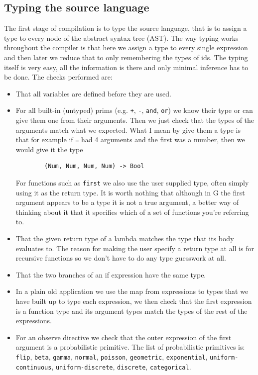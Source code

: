 \documentclass[a4paper]{article}
\begin{document}
\subsection{Typing the source language}

The first stage of compilation is to type the source language, that is to assign a type to every node of the abstract syntax tree (AST). The way typing works throughout the compiler is that here we assign a type to every single expression and then later we reduce that to only remembering the types of ids. The typing itself is very easy, all the information is there and only minimal inference has to be done. The checks performed are:
\begin{itemize}
\item
	That all variables are defined before they are used.

\item
	For all built-in (untyped) prims (e.g. \texttt{+}, \texttt{-}, \texttt{and}, \texttt{or}) we know their type or can give them one from their arguments. Then we just check that the types of the arguments match what we expected. What I mean by give them a type is that for example if \texttt{=} had 4 arguments and the first was a number, then we would give it the type
	\begin{verbatim}
		(Num, Num, Num, Num) -> Bool
	\end{verbatim}
	For functions such as \texttt{first} we also use the user supplied type, often simply using it as the return type. It is worth nothing that although in G the first argument appears to be a type it is not a true argument, a better way of thinking about it that it specifies which of a set of functions you're referring to.

\item
	That the given return type of a lambda matches the type that its body evaluates to. The reason for making the user specify a return type at all is for recursive functions so we don't have to do any type guesswork at all.

\item
	That the two branches of an if expression have the same type.

\item
	In a plain old application we use the map from expressions to types that we have built up to type each expression, we then check that the first expression is a function type and its argument types match the types of the rest of the expressions.

\item
	For an observe directive we check that the outer expression of the first argument is a probabilistic primitive. The list of probabilistic primitives is: \texttt{flip}, \texttt{beta}, \texttt{gamma}, \texttt{normal}, \texttt{poisson}, \texttt{geometric}, \texttt{exponential}, \texttt{uniform-continuous}, \texttt{uniform-discrete}, \texttt{discrete}, \texttt{categorical}.

\end{itemize}
\end{document}
